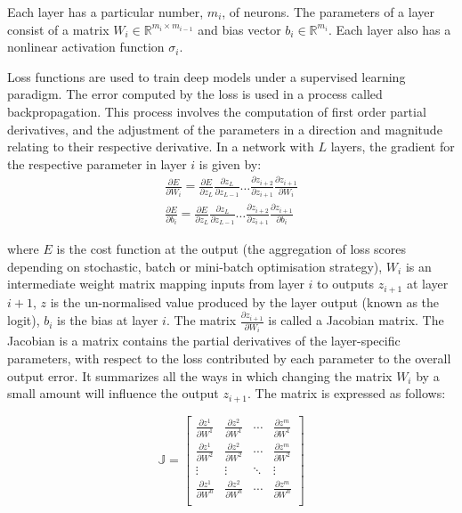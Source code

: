 \noindent Each layer has a particular number,  $m_i$, of neurons. The parameters of a layer consist of a matrix $W_i \in \mathbb{R}^{m_i \times m_{i-1}}$ and bias vector $b_i \in  \mathbb{R}^{m_i}$. Each layer also has a nonlinear activation function $\sigma_i$. 

\noindent Loss functions are used to train deep models under a supervised learning paradigm. The error computed by the loss is used in a process called backpropagation. This process involves the computation of first order partial derivatives, and the adjustment of the parameters in a direction and magnitude relating to their respective derivative. In a network with $ L $ layers, the gradient for the respective parameter in layer $ i $ is given by:
\begin{subequations}
	\begin{gather}
		\frac{\partial E} {\partial W_i} = \frac{\partial E} {\partial z_L}\frac{\partial z_L} {\partial z_{L - 1}}  \dots \frac{\partial z_{i + 2}} {\partial z_{i + 1}}\frac{\partial z_{i + 1}} {\partial W_{i}} \\
		\frac{\partial E} {\partial b_i} = \frac{\partial E} {\partial z_L}\frac{\partial z_L} {\partial z_{L - 1}}  \dots \frac{\partial z_{i + 2}} {\partial z_{i + 1}}\frac{\partial z_{i + 1}} {\partial b_{i}}
	\end{gather}
\end{subequations}

\noindent where $ E $ is the cost function at the output (the aggregation of loss scores depending on stochastic, batch or mini-batch optimisation strategy), $ W_i $ is an intermediate weight matrix mapping inputs from layer $ i $ to outputs $ z_{i + 1} $  at layer $ i + 1 $, $ z $ is the un-normalised value produced by the layer output (known as the logit), $ b_i $ is the bias at layer $ i $. The matrix $ \frac{\partial z_{i + 1}} {\partial W_i} $ is called a Jacobian matrix. The Jacobian is a matrix contains the partial derivatives of the layer-specific parameters, with respect to the loss contributed by each parameter to the overall output error. It summarizes all the ways in which changing the matrix $ W_i $ by a small amount will influence the output $ z_{i + 1} $. The matrix is expressed as follows: \par
\begin{equation}
	\renewcommand\arraystretch{2}
	\mathbb{J} = \begin{bmatrix}
        		\frac{\partial z^1}{\partial W^1} & \frac{\partial z^2}{\partial W^1} & \cdots & \frac{\partial z^m}{\partial W^1} \\
           	\frac{\partial z^1}{\partial W^2} &\frac{\partial z^2}{\partial W^2} & \cdots & \frac{\partial z^m}{\partial W^2} \\
           	\vdots & \vdots & \ddots & \vdots \\
           	\frac{\partial z^1}{\partial W^n} & \frac{\partial z^2}{\partial W^n} & \cdots & \frac{\partial z^m}{\partial W^n} \\
        \end{bmatrix}
\end{equation}

